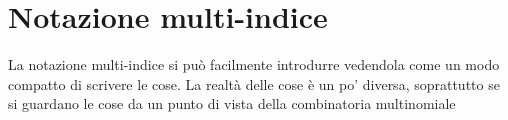 \chapter{Notazione multi-indice}
	La notazione multi-indice si può facilmente introdurre vedendola come un modo compatto di scrivere le cose. La realtà delle cose è un po' diversa, soprattutto se si guardano le cose da un punto di vista della combinatoria multinomiale